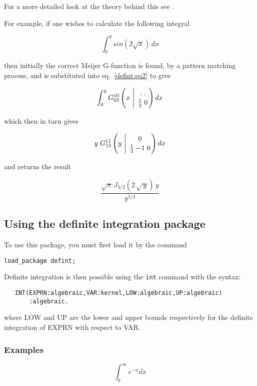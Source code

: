 For a more detailed look at the theory behind this see 
\cite{Adamchik:90}.

For example, if one wishes to calculate the following integral

\begin{displaymath}
\int_{0}^{y} sin(2 \sqrt{x}) \, dx 
\end{displaymath}

then initially the correct Meijer G-function is found, by a pattern 
matching process, and is substituted 
into eq.~\ref{defint:eq2} to give

\begin{displaymath}
\int_{0}^{y} G^{1 0}_{0 2}\left(x 
\ \Bigg\vert \ {. \; .  \atop \frac{1}{2} \; 0} \right) dx
\end{displaymath}

which then in turn gives

\begin{displaymath}
y \; G^{1 1}_{1 3}\left(y \ \Bigg\vert \ {0 \atop 
\frac{1}{2} -\!1 \; 0} \right) dx
\end{displaymath}

and returns the result

\begin{displaymath}
\frac{\sqrt{\pi} \, J_{3/2}(2 \, \sqrt{\,y}) \, y}{y^{1/4}}
\end{displaymath}

\subsection{Using the definite integration package}
To use this package, you must first load it by the command
\begin{verbatim}
load_package defint;
\end{verbatim}
Definite integration is then possible using the \verb+int+
command with the syntax:
\begin{verbatim}
   INT(EXPRN:algebraic,VAR:kernel,LOW:algebraic,UP:algebraic)
       :algebraic.
\end{verbatim}
where LOW and UP are the lower and upper bounds respectively for
the definite integration of EXPRN with respect to VAR.

\subsubsection{Examples}

\begin{displaymath}
\int_{0}^{\infty} e^{-x} dx 
\end{displaymath}


